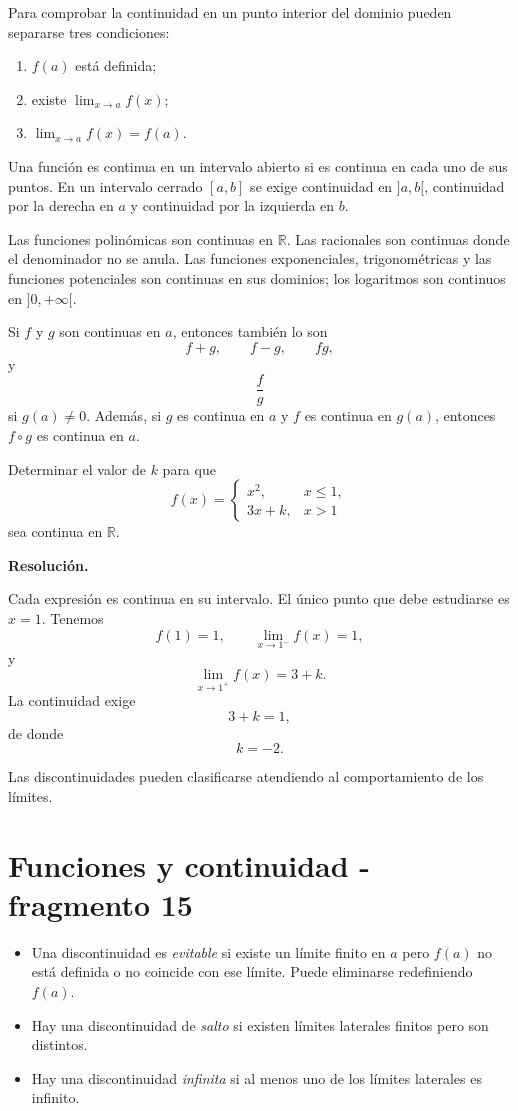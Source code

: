 Para comprobar la continuidad en un punto interior del dominio pueden separarse tres condiciones:
\begin{enumerate}
\item $f(a)$ está definida;
\item existe $\displaystyle\lim_{x\to a}f(x)$;
\item $\displaystyle\lim_{x\to a}f(x)=f(a)$.
\end{enumerate}

\begin{definition}
Una función es continua en un intervalo abierto si es continua en cada uno de sus puntos. En un intervalo cerrado $[a,b]$ se exige continuidad en $]a,b[$, continuidad por la derecha en $a$ y continuidad por la izquierda en $b$.
\end{definition}

Las funciones polinómicas son continuas en $\mathbb{R}$. Las racionales son continuas donde el denominador no se anula. Las funciones exponenciales, trigonométricas y las funciones potenciales son continuas en sus dominios; los logaritmos son continuos en $]0,+\infty[$.

\begin{proposition}
Si $f$ y $g$ son continuas en $a$, entonces también lo son
\[
f+g,\qquad f-g,\qquad fg,
\]
y
\[
\frac fg
\]
si $g(a)\neq0$. Además, si $g$ es continua en $a$ y $f$ es continua en $g(a)$, entonces $f\circ g$ es continua en $a$.
\end{proposition}

\begin{solvedexercise}
Determinar el valor de $k$ para que
\[
f(x)=
\begin{cases}
x^2, & x\leq1,\\
3x+k, & x>1
\end{cases}
\]
sea continua en $\mathbb{R}$.

\textbf{Resolución.}\par\smallskip
Cada expresión es continua en su intervalo. El único punto que debe estudiarse es $x=1$. Tenemos
\[
f(1)=1,
\qquad
\lim_{x\to1^-}f(x)=1,
\]
y
\[
\lim_{x\to1^+}f(x)=3+k.
\]
La continuidad exige
\[
3+k=1,
\]
de donde
\[
\boxed{k=-2.}
\]
\end{solvedexercise}

Las discontinuidades pueden clasificarse atendiendo al comportamiento de los límites.


\section{Funciones y continuidad - fragmento 15}
\begin{itemize}
\item Una discontinuidad es \emph{evitable} si existe un límite finito en $a$ pero $f(a)$ no está definida o no coincide con ese límite. Puede eliminarse redefiniendo $f(a)$.
\item Hay una discontinuidad de \emph{salto} si existen límites laterales finitos pero son distintos.
\item Hay una discontinuidad \emph{infinita} si al menos uno de los límites laterales es infinito.
\end{itemize}

